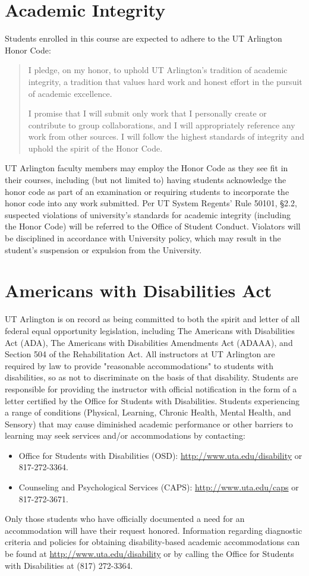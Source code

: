 \documentclass[10pt]{article}
\begin{document}
\section*{Academic Integrity}
\label{sec:orgheadline11}
Students enrolled in this course are expected to adhere to the UT Arlington Honor Code:
\begin{quote}
I pledge, on my honor, to uphold UT Arlington’s tradition of academic integrity, a tradition that
values hard work and honest effort in the pursuit of academic excellence.

I promise that I will submit only work that I personally create or contribute to group
collaborations, and I will appropriately reference any work from other sources. I will follow the
highest standards of integrity and uphold the spirit of the Honor Code.
\end{quote}
UT Arlington faculty members may employ the Honor Code as they see fit in their courses, including (but not
limited to) having students acknowledge the honor code as part of an examination or requiring students to
incorporate the honor code into any work submitted. Per UT System Regents’ Rule 50101, §2.2, suspected
violations of university’s standards for academic integrity (including the Honor Code) will be referred to the
Office of Student Conduct. Violators will be disciplined in accordance with University policy, which may
result in the student’s suspension or expulsion from the University.
\section*{Americans with Disabilities Act}
\label{sec:orgheadline12}
UT Arlington is on record as being committed to both the spirit and letter of all federal equal opportunity legislation, including The Americans with Disabilities Act (ADA), The Americans with Disabilities Amendments Act (ADAAA), and Section 504 of the Rehabilitation Act. 
All instructors at UT Arlington are required by law to provide "reasonable accommodations" to
students with disabilities, so as not to discriminate on the basis of that disability. 
Students are responsible for providing the instructor with official notification in the form of a letter certified by the Office for Students with Disabilities. Students experiencing a range of conditions (Physical, Learning, Chronic Health, Mental Health, and Sensory) that may cause diminished academic performance or other barriers to learning may seek services and/or accommodations by contacting: 
\begin{itemize}
\item Office for Students with Disabilities (OSD): \url{http://www.uta.edu/disability} or 817-272-3364.
\item Counseling and Psychological Services (CAPS): \url{http://www.uta.edu/caps} or 817-272-3671.
\end{itemize}
Only those students who
have officially documented a need for an accommodation will have their request honored. Information
regarding diagnostic criteria and policies for obtaining disability-based academic accommodations can be
found at \url{http://www.uta.edu/disability} or by calling the Office for Students with Disabilities at (817) 272-3364.
\end{document}
